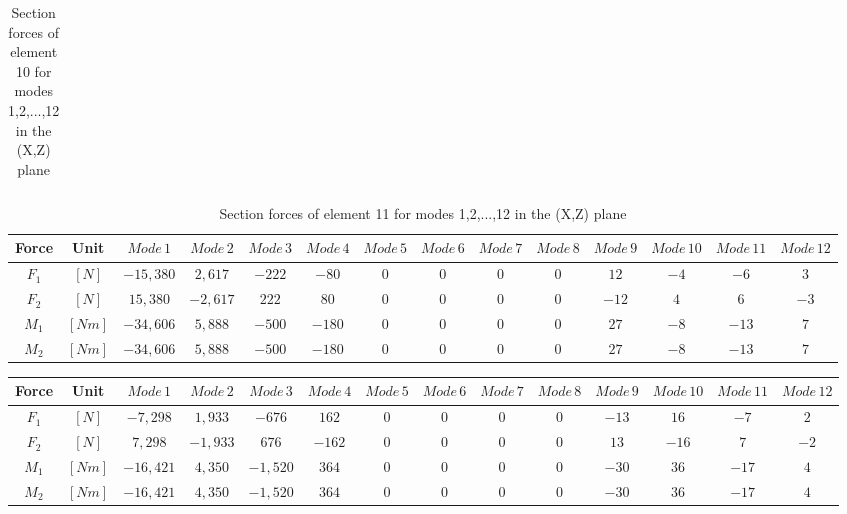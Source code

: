 \documentclass[11pt,a4paper,titlepage]{report}
\begin{document}
\begin{appendix}
\begin{landscape}
\begin{table}[]
\begin{tiny}
\begin{tabular}{c|c|c|c|c|c|c|c|c|c|c|c|c|c}
        \end{tabular}
        \end{tiny}
    \caption{Section forces of element 10 for modes 1,2,...,12 in the (X,Z) plane}
    \label{tab:my_label}
\end{table}
\begin{table}[]
    \centering
    \begin{tiny}
    \begin{tabular}{c|c|c|c|c|c|c|c|c|c|c|c|c|c}
    Force & Unit & $Mode\,1$ & $Mode\,2$ & $Mode\,3$ & $Mode\,4$ & $Mode\,5$ & $Mode\,6$ & $Mode\,7$ & $Mode\,8$ & $Mode\,9$ & $Mode\,10$ & $Mode\,11$ & $Mode\,12$\\
    \hline
   $F_1$ & $[N]$ & $-15,380$ & $2,617$ & $-222$ & $-80$ & $0$ & $0$ & $0$ & $0$ & $12$ & $-4$ & $-6$ &  $3$\\
   $F_2$ & $[N]$ & $15,380$ & $-2,617$ & $222$ & $80$ & $0$ & $0$ & $0$ & $0$ & $-12$ & $4$ & $6$ &  $-3$\\
    $M_1$ & $[Nm]$ & $-34,606 $ & $5,888 $ & $-500$ & $-180$ & $0$ & $0$ & $0$ & $0$ & $27$ & $-8$ & $-13$ &  $7$\\
    $M_2$ & $[Nm]$ & $-34,606 $ & $5,888 $ & $-500$ & $-180$ & $0$ & $0$ & $0$ & $0$ & $27$ & $-8$ & $-13$ &  $7$\\
        \end{tabular}
        \end{tiny}
    \caption{Section forces of element 11 for modes 1,2,...,12 in the (X,Z) plane}
    \label{tab:my_label}
\end{table}
\begin{table}[]
    \centering
    \begin{tiny}
    \begin{tabular}{c|c|c|c|c|c|c|c|c|c|c|c|c|c}
    Force & Unit & $Mode\,1$ & $Mode\,2$ & $Mode\,3$ & $Mode\,4$ & $Mode\,5$ & $Mode\,6$ & $Mode\,7$ & $Mode\,8$ & $Mode\,9$ & $Mode\,10$ & $Mode\,11$ & $Mode\,12$\\
    \hline
   $F_1$ & $[N]$ & $-7,298$ & $1,933$ & $-676$ & $162$ & $0$ & $0$ & $0$ & $0$ & $-13$ & $16$ & $-7$ &  $2$\\
   $F_2$ & $[N]$ & $7,298$ & $-1,933$ & $676$ & $-162$ & $0$ & $0$ & $0$ & $0$ & $13$ & $-16$ & $7$ &  $-2$\\
    $M_1$ & $[Nm]$ & $-16,421$ & $4,350 $ & $-1,520$ & $364$ & $0$ & $0$ & $0$ & $0$ & $-30$ & $36$ & $-17$ &  $4$\\
    $M_2$ & $[Nm]$ & $-16,421$ & $4,350 $ & $-1,520$ & $364$ & $0$ & $0$ & $0$ & $0$ & $-30$ & $36$ & $-17$ &  $4$\\

\end{tabular}
\end{tiny}
\end{table}
\end{landscape}
\end{appendix}
\end{document}
